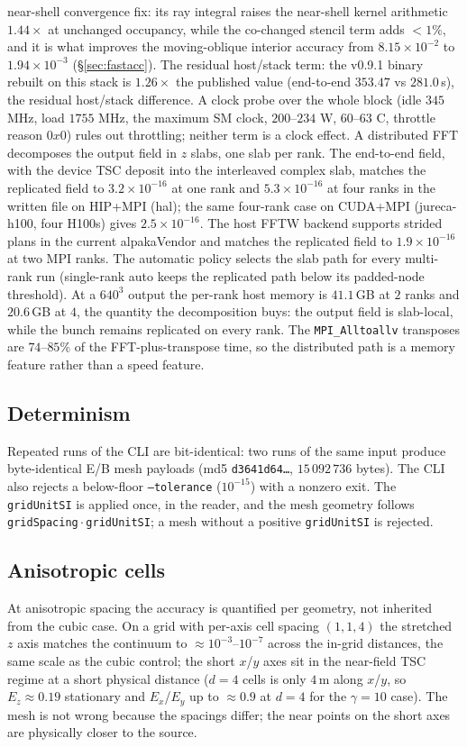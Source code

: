 near-shell convergence fix: its
ray integral raises the near-shell kernel arithmetic $1.44\times$ at
unchanged occupancy, while the co-changed stencil term adds $<1\%$, and
it is what improves the moving-oblique interior accuracy from
$8.15\times10^{-2}$ to $1.94\times10^{-3}$ (\S\ref{sec:fastacc}).
The residual host/stack term: the
v0.9.1 binary rebuilt on this stack is $1.26\times$ the published value
(end-to-end $353.47$ vs $281.0$\,s), the residual host/stack difference.
A clock probe over the whole block (idle $345$ MHz, load $1755$ MHz, the
maximum SM clock, $200$--$234$ W, $60$--$63$ C, throttle reason $0x0$)
rules out throttling; neither term is a clock effect. A distributed FFT
decomposes the output
field in $z$ slabs, one slab per rank. The end-to-end field, with
the device TSC deposit into the interleaved complex slab, matches the
replicated field to $3.2\times10^{-16}$ at one rank and $5.3\times10^{-16}$
at four ranks in the written file on HIP+MPI (hal); the same four-rank case on
CUDA+MPI (jureca-h100, four H100s) gives $2.5\times10^{-16}$. The host
FFTW backend supports strided plans in the current alpakaVendor and matches
the replicated field to $1.9\times10^{-16}$ at two MPI ranks. The automatic
policy selects the slab path for every multi-rank run (single-rank auto keeps the
replicated path below its padded-node threshold). At a $640^{3}$ output the
per-rank host memory is
$41.1$\,GB at $2$ ranks and $20.6$\,GB at $4$, the quantity the
decomposition buys: the output field is slab-local, while the bunch remains
replicated on every rank. The \texttt{MPI\_Alltoallv} transposes are
$74$--$85\%$ of the FFT-plus-transpose time, so the distributed path is a
memory feature rather than a speed feature.

\subsection{Determinism}

Repeated runs of the CLI are bit-identical: two runs of the same
input produce byte-identical E/B mesh payloads (md5
\texttt{d3641d64\ldots}, $15\,092\,736$ bytes). The CLI also rejects a
below-floor \texttt{--tolerance} ($10^{-15}$) with a nonzero exit. The
\texttt{gridUnitSI} is applied once, in the reader, and the mesh geometry
follows \texttt{gridSpacing}\,$\cdot$\,\texttt{gridUnitSI}; a mesh without
a positive \texttt{gridUnitSI} is rejected.

\subsection{Anisotropic cells}
\label{sec:anisotropic}

At anisotropic spacing the accuracy is quantified per geometry, not
inherited from the cubic case. On a grid with per-axis cell spacing
$(1,1,4)$ the stretched $z$ axis matches the continuum to
$\approx10^{-3}$--$10^{-7}$ across the in-grid distances, the same scale as
the cubic control; the short $x$/$y$ axes sit in the near-field TSC regime
at a short physical distance ($d=4$ cells is only $4$\,m along $x$/$y$, so
$E_z\approx0.19$ stationary and $E_x$/$E_y$ up to $\approx0.9$ at $d=4$
for the $\gamma=10$ case). The mesh is not wrong because the spacings
differ; the near points on the short axes are physically closer to the
source.
